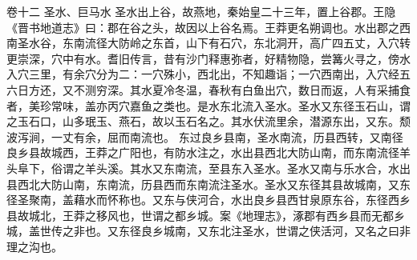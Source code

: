 \documentclass[12pt,UTF8]{ctexbook}
\begin{document}
卷十二  圣水、巨马水 
圣水出上谷，故燕地，秦始皇二十三年，置上谷郡。王隐《晋书地道志》曰：郡在谷之头，故因以上谷名焉。王莽更名朔调也。水出郡之西南圣水谷，东南流径大防岭之东首，山下有石穴，东北洞开，高广四五丈，入穴转更崇深，穴中有水。耆旧传言，昔有沙门释惠弥者，好精物隐，尝篝火寻之，傍水入穴三里，有余穴分为二：一穴殊小，西北出，不知趣诣；一穴西南出，入穴经五六日方还，又不测穷深。其水夏冷冬温，春秋有白鱼出穴，数日而返，人有采捕食者，美珍常味，盖亦丙穴嘉鱼之类也。是水东北流入圣水。圣水又东径玉石山，谓之玉石口，山多珉玉、燕石，故以玉石名之。其水伏流里余，潜源东出，又东。颓波泻涧，一丈有余，屈而南流也。
东过良乡县南，圣水南流，历县西转，又南径良乡县故城西，王莽之广阳也，有防水注之，水出县西北大防山南，而东南流径羊头阜下，俗谓之羊头溪。其水又东南流，至县东入圣水。圣水又南与乐水合，水出县西北大防山南，东南流，历县西而东南流注圣水。圣水又东径其县故城南，又东径圣聚南，盖藉水而怀称也。又东与侠河合，水出良乡县西甘泉原东谷，东径西乡县故城北，王莽之移风也，世谓之都乡城。案《地理志》，涿郡有西乡县而无都乡城，盖世传之非也。又东径良乡城南，又东北注圣水，世谓之侠活河，又名之曰非理之沟也。
\end{document}
